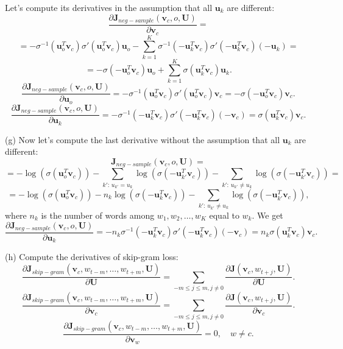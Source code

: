 \documentclass[12pt]{article}
\begin{document}
Let's compute its derivatives in the assumption that all $\mathbf{u}_k$ are different:
$$
\frac{\partial\mathbf{J}_{neg-sample}(\mathbf{v}_c, o, \mathbf{U})}{\partial \mathbf{v}_c} =
$$
$$
=-\sigma^{-1}(\mathbf{u}_o^T \mathbf{v}_c)\sigma'(\mathbf{u}_o^T \mathbf{v}_c)\mathbf{u}_o
-\sum_{k=1}^K \sigma^{-1}(-\mathbf{u}_k^T \mathbf{v}_c)\sigma'(-\mathbf{u}_k^T \mathbf{v}_c)(-\mathbf{u}_k) =
$$
$$
= -\sigma(-\mathbf{u}_o^T \mathbf{v}_c)\mathbf{u}_o + \sum_{k=1}^K \sigma(\mathbf{u}_k^T \mathbf{v}_c) \mathbf{u}_k.
$$
$$
\frac{\partial\mathbf{J}_{neg-sample}(\mathbf{v}_c, o, \mathbf{U})}{\partial \mathbf{u}_o} =
-\sigma^{-1}(\mathbf{u}_o^T \mathbf{v}_c)\sigma'(\mathbf{u}_o^T \mathbf{v}_c)\mathbf{v}_c =
-\sigma(-\mathbf{u}_o^T \mathbf{v}_c)\mathbf{v}_c.
$$
$$
\frac{\partial\mathbf{J}_{neg-sample}(\mathbf{v}_c, o, \mathbf{U})}{\partial \mathbf{u}_k} =
-\sigma^{-1}(-\mathbf{u}_k^T \mathbf{v}_c)\sigma'(-\mathbf{u}_k^T \mathbf{v}_c)(-\mathbf{v}_c) =
\sigma(\mathbf{u}_k^T \mathbf{v}_c) \mathbf{v}_c.
$$
\medskip

\noindent (g) Now let's compute the last derivative without the assumption that all $\mathbf{u}_k$ are different:
$$
\mathbf{J}_{neg-sample}(\mathbf{v}_c, o, \mathbf{U}) =
$$
$$
= -\log(\sigma(\mathbf{u}_o^T \mathbf{v}_c))
- \sum_{k':\, u_{k'} = u_k} \log(\sigma(-\mathbf{u}_{k'}^T \mathbf{v}_c))
- \sum_{k':\, u_{k'} \ne u_k} \log(\sigma(-\mathbf{u}_{k'}^T \mathbf{v}_c)) =
$$
$$
= -\log(\sigma(\mathbf{u}_o^T \mathbf{v}_c))
- n_k \log(\sigma(-\mathbf{u}_k^T \mathbf{v}_c))
- \sum_{k':\, u_{k'} \ne u_k} \log(\sigma(-\mathbf{u}_{k'}^T \mathbf{v}_c)),
$$
where $n_k$ is the number of words among $w_1, w_2, \ldots, w_K$ equal to $w_k$. We get
$$
\frac{\partial\mathbf{J}_{neg-sample}(\mathbf{v}_c, o, \mathbf{U})}{\partial \mathbf{u}_k} =
-n_k \sigma^{-1}(-\mathbf{u}_k^T \mathbf{v}_c)\sigma'(-\mathbf{u}_k^T \mathbf{v}_c)(-\mathbf{v}_c) =
n_k \sigma(\mathbf{u}_k^T \mathbf{v}_c) \mathbf{v}_c.
$$
\medskip

\noindent (h) Compute the derivatives of skip-gram loss:
$$
\frac{\partial\mathbf{J}_{skip-gram}(\mathbf{v}_c, w_{t-m}, \ldots, w_{t+m}, \mathbf{U})}{\partial \mathbf{U}} = \sum_{-m\le j \le m, j\ne 0} \frac{\partial\mathbf{J}(\mathbf{v}_c, w_{t+j}, \mathbf{U})}{\partial \mathbf{U}}.
$$
$$
\frac{\partial\mathbf{J}_{skip-gram}(\mathbf{v}_c, w_{t-m}, \ldots, w_{t+m}, \mathbf{U})}{\partial \mathbf{v}_c} = \sum_{-m\le j \le m, j\ne 0} \frac{\partial\mathbf{J}(\mathbf{v}_c, w_{t+j}, \mathbf{U})}{\partial \mathbf{v}_c}.
$$
$$
\frac{\partial\mathbf{J}_{skip-gram}(\mathbf{v}_c, w_{t-m}, \ldots, w_{t+m}, \mathbf{U})}{\partial \mathbf{v}_w} = 0, \quad w \ne c.
$$
\end{document}
